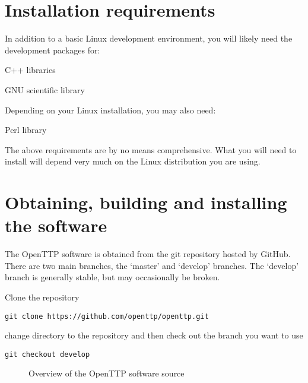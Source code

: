 
\section{Installation requirements}

In addition to a basic Linux development environment, you will likely need the development packages for:
\begin{description*}
	\item[\cc{boost}]  C++ libraries
	\item[\cc{libgsl}] GNU scientific library
\end{description*}

Depending on your Linux installation, you may also need:
\begin{description*}
	\item[\cc{Time::HiRes}] Perl library
\end{description*}

The above requirements are by no means comprehensive.
What you will need to install will depend very much on the
Linux distribution you are using.

\section{Obtaining, building and installing the software}

The OpenTTP software is obtained from the git repository hosted by GitHub.
There are two main branches, the `master' and `develop' branches.
The `develop' branch is generally stable, but may occasionally be broken.

Clone the repository
\begin{lstlisting}
git clone https://github.com/openttp/openttp.git
\end{lstlisting}
change directory to the repository and then check out the branch you want to use
\begin{lstlisting}
git checkout develop
\end{lstlisting}

\begin{figure}
\caption{Overview of the OpenTTP software source}
\end{figure}


